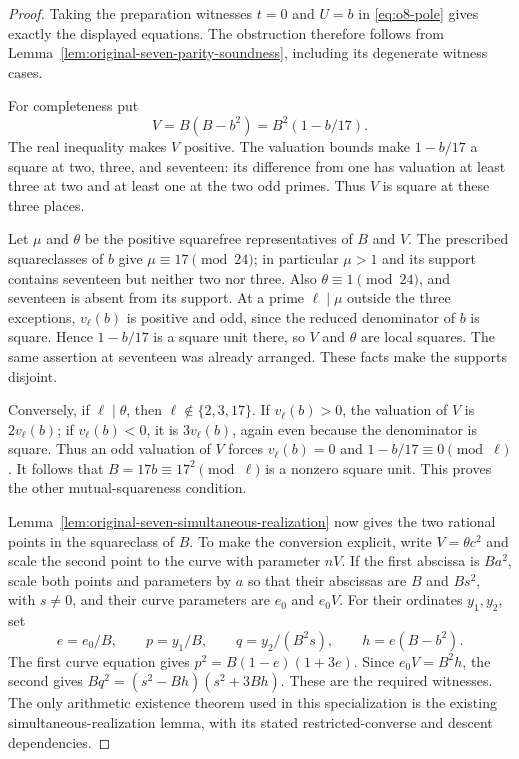 \begin{proof}
Taking the preparation witnesses $t=0$ and $U=b$ in
\eqref{eq:o8-pole} gives exactly the displayed equations.
The obstruction therefore follows from
Lemma~\ref{lem:original-seven-parity-soundness}, including its
degenerate witness cases.

For completeness put
\[
 V=B(B-b^2)=B^2(1-b/17).
\]
The real inequality makes $V$ positive. The valuation bounds make
$1-b/17$ a square at two, three, and seventeen: its difference
from one has valuation at least three at two and at least one
at the two odd primes. Thus $V$ is square at these three places.

Let $\mu$ and $\theta$ be the positive squarefree representatives
of $B$ and $V$. The prescribed squareclasses of $b$ give
$\mu\equiv17\pmod{24}$; in particular $\mu>1$ and its support
contains seventeen but neither two nor three. Also
$\theta\equiv1\pmod{24}$, and seventeen is absent from its
support. At a prime $\ell\mid\mu$ outside the three exceptions,
$v_\ell(b)$ is positive and odd, since the reduced denominator
of $b$ is square. Hence $1-b/17$ is a square unit there, so $V$
and $\theta$ are local squares. The same assertion at seventeen
was already arranged. These facts make the supports disjoint.

Conversely, if $\ell\mid\theta$, then
$\ell\notin\{2,3,17\}$. If $v_\ell(b)>0$, the valuation
of $V$ is $2v_\ell(b)$; if $v_\ell(b)<0$, it is
$3v_\ell(b)$, again even because the denominator is square.
Thus an odd valuation of $V$ forces $v_\ell(b)=0$ and
$1-b/17\equiv0\pmod\ell$. It follows that
$B=17b\equiv17^2\pmod\ell$ is a nonzero square unit.
This proves the other mutual-squareness condition.

Lemma~\ref{lem:original-seven-simultaneous-realization} now gives
the two rational points in the squareclass of $B$. To make the
conversion explicit, write $V=\theta c^2$ and scale the second
point to the curve with parameter $nV$. If the first abscissa is
$Ba^2$, scale both points and parameters by $a$ so that their
abscissas are $B$ and $Bs^2$, with $s\ne0$, and their curve
parameters are $e_0$ and $e_0V$. For their ordinates $y_1,y_2$, set
\[
 e=e_0/B,\qquad p=y_1/B,\qquad q=y_2/(B^2s),\qquad
 h=e(B-b^2).
\]
The first curve equation gives $p^2=B(1-e)(1+3e)$.
Since $e_0V=B^2h$, the second gives
$Bq^2=(s^2-Bh)(s^2+3Bh)$. These are the required witnesses.
The only arithmetic existence theorem used in this specialization
is the existing simultaneous-realization lemma, with its stated
restricted-converse and descent dependencies.
\end{proof}


